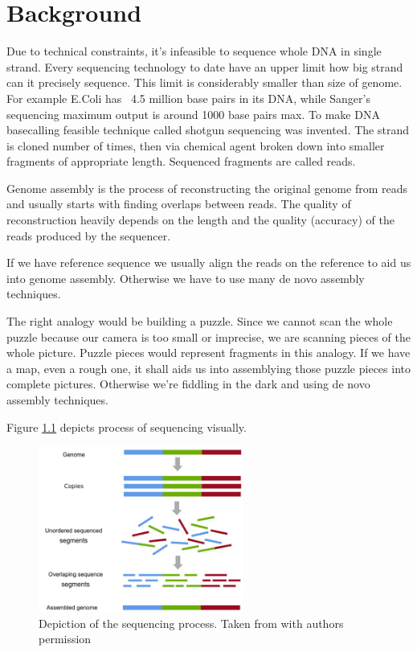 \documentclass[times, utf8, diplomski, english]{fer}
\begin{document}
\chapter{Background}
\label{chap:background}
Due to technical constraints, it's infeasible  to sequence whole DNA in single strand. 
Every sequencing technology to date have an upper limit how big strand can it precisely sequence.
This limit is considerably smaller than size of genome.
For example E.Coli has ~4.5 million base pairs in its DNA, while Sanger's sequencing maximum output is around 1000 base pairs max.
To make DNA basecalling feasible technique called shotgun sequencing was invented. 
The strand is cloned number of times, then via chemical  agent broken down into smaller fragments of appropriate length. 
Sequenced fragments are called reads.

Genome assembly is the process of reconstructing the original genome from reads and usually starts with finding overlaps between reads.
The quality of reconstruction heavily depends on the length and the quality (accuracy) of the reads produced by the sequencer. 

If we have reference sequence we usually align the reads on the reference to aid us into genome assembly. Otherwise we have to use many de novo assembly techniques.

The right analogy would be building a puzzle. Since we cannot scan the whole puzzle because our camera is too small or imprecise, we are scanning pieces of the whole picture. Puzzle pieces would represent fragments in this analogy. If we have a map, even a rough one, it shall aids us into assemblying those puzzle pieces into complete pictures. Otherwise we're fiddling in the dark and using de novo assembly techniques.

Figure \ref{fg:sequencing} depicts process of sequencing visually.

\begin{figure}[!ht]
    \begin{center}
        \includegraphics[width=0.6\textwidth]{shotgun-sequencing}
        \caption{Depiction of the sequencing process. Taken from \citep{mratkovic} with authors permission}
        \label{fg:sequencing}
    \end{center}
\end{figure}
\end{document}
